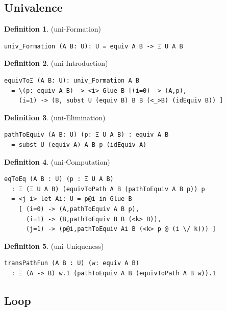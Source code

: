 \documentclass{article}
\theoremstyle{definition}
\newtheorem{definition}{Definition}
\begin{document}
\newpage
\subsection{Univalence}

\begin{definition} (uni-Formation)
\begin{lstlisting}
univ_Formation (A B: U): U = equiv A B -> Ξ U A B
\end{lstlisting}
\end{definition}

\begin{definition} (uni-Introduction)
\begin{lstlisting}
equivToΞ (A B: U): univ_Formation A B
  = \(p: equiv A B) -> <i> Glue B [(i=0) -> (A,p),
    (i=1) -> (B, subst U (equiv B) B B (<_>B) (idEquiv B)) ]
\end{lstlisting}
\end{definition}

\begin{definition} (uni-Elimination)
\begin{lstlisting}
pathToEquiv (A B: U) (p: Ξ U A B) : equiv A B
  = subst U (equiv A) A B p (idEquiv A)
\end{lstlisting}
\end{definition}

\begin{definition} (uni-Computation)
\begin{lstlisting}
eqToEq (A B : U) (p : Ξ U A B)
  : Ξ (Ξ U A B) (equivToPath A B (pathToEquiv A B p)) p
  = <j i> let Ai: U = p@i in Glue B
    [ (i=0) -> (A,pathToEquiv A B p),
      (i=1) -> (B,pathToEquiv B B (<k> B)),
      (j=1) -> (p@i,pathToEquiv Ai B (<k> p @ (i \/ k))) ]

\end{lstlisting}
\end{definition}

\begin{definition} (uni-Uniqueness)
\begin{lstlisting}
transPathFun (A B : U) (w: equiv A B)
  : Ξ (A -> B) w.1 (pathToEquiv A B (equivToPath A B w)).1
\end{lstlisting}
\end{definition}

\newpage
\subsection{Loop}
\end{document}
